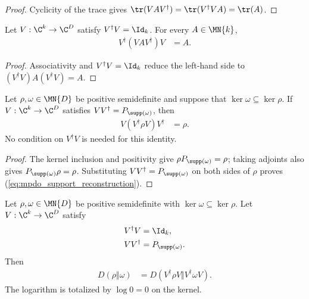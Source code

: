 \begin{proof}\leanok
    Cyclicity of the trace gives
    $\tr(VAV^\dagger)=\tr(V^\dagger VA)=\tr(A)$.
\end{proof}

\begin{theorem}
    \label{thm:isometric_compression_expansion}
    \leanok
    Let $V:\C^k\to\C^D$ satisfy $V^\dagger V=\Id_k$. For every
    $A\in\MN{k}$,
    \begin{align}
        V^\dagger(VAV^\dagger)V & =A.
        \label{eq:mpdo_isometric_compression_expansion}
    \end{align}
\end{theorem}

\begin{proof}\leanok
    Associativity and $V^\dagger V=\Id_k$ reduce the left-hand side to
    $(V^\dagger V)A(V^\dagger V)=A$.
\end{proof}

\begin{theorem}
    \label{thm:support_compression_reconstruction}
    \leanok
    Let $\rho,\omega\in\MN{D}$ be positive semidefinite and suppose that
    $\ker\omega\subseteq\ker\rho$. If
    $V:\C^k\to\C^D$ satisfies $VV^\dagger=P_{\supp(\omega)}$, then
    \begin{align}
        V(V^\dagger\rho V)V^\dagger & =\rho.
        \label{eq:mpdo_support_reconstruction}
    \end{align}
    No condition on $V^\dagger V$ is needed for this identity.
\end{theorem}

\begin{proof}\leanok
    The kernel inclusion and positivity give
    $\rho P_{\supp(\omega)}=\rho$; taking adjoints also gives
    $P_{\supp(\omega)}\rho=\rho$. Substituting
    $VV^\dagger=P_{\supp(\omega)}$ on both sides of $\rho$ proves
    (\ref{eq:mpdo_support_reconstruction}).
\end{proof}

\begin{theorem}
    \label{thm:relative_entropy_support_compression}
    \leanok
    Let $\rho,\omega\in\MN{D}$ be positive semidefinite with
    $\ker\omega\subseteq\ker\rho$. Let $V:\C^k\to\C^D$ satisfy
    \begin{align}
        V^\dagger V & =\Id_k,             \\
        VV^\dagger  & =P_{\supp(\omega)}.
        \label{eq:mpdo_reference_support_isometry}
    \end{align}
    Then
    \begin{align}
        D(\rho\Vert\omega)
         & =D(V^\dagger\rho V\Vert V^\dagger\omega V).
        \label{eq:mpdo_relative_entropy_support_compression}
    \end{align}
    The logarithm is totalized by $\log 0=0$ on the kernel.
\end{theorem}

